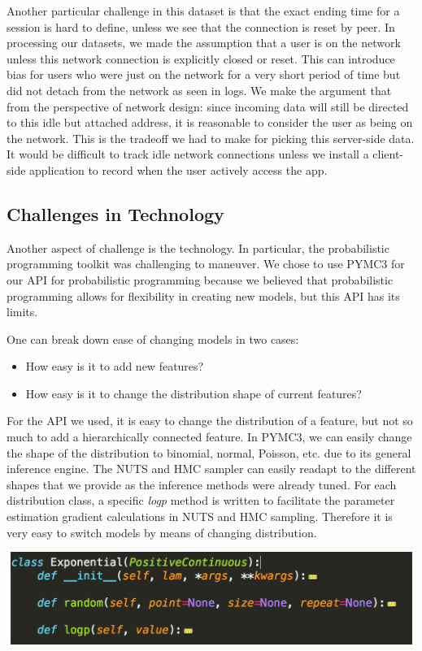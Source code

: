\documentclass[]{article}
\newenvironment{Figure}
  {\par\medskip\noindent\minipage{\linewidth}}
  {\endminipage\par\medskip}
\begin{document}
Another particular challenge in this dataset is that the exact ending time for a session is hard to define, unless we see that the connection is reset by peer. In processing our datasets, we made the assumption that a user is on the network unless this network connection is explicitly closed or reset. This can introduce bias for users who were just on the network for a very short period of time but did not detach from the network as seen in logs. We make the argument that from the perspective of network design: since incoming data will still be directed to this idle but attached address, it is reasonable to consider the user as being on the network. This is the tradeoff we had to make for picking this server-side data. It would be difficult to track idle network connections unless we install a client-side application to record when the user actively access the app.

\subsection{Challenges in Technology}
Another aspect of challenge is the technology. In particular, the probabilistic programming toolkit was challenging to maneuver. We chose to use PYMC3 for our API for probabilistic programming because we believed that probabilistic programming allows for flexibility in creating new models, but this API has its limits. 

One can break down ease of changing models in two cases:

\begin{itemize}
\item
How easy is it to add new features?
\item
How easy is it to change the distribution shape of current features?
\end{itemize}

For the API we used, it is easy to change the distribution of a feature, but not so much to add a hierarchically connected feature. In PYMC3, we can easily change the shape of the distribution to binomial, normal, Poisson, etc. due to its general inference engine. The NUTS and HMC sampler can easily readapt to the different shapes that we provide as the inference methods were already tuned. For each distribution class, a specific \textit{logp} method is written to facilitate the parameter estimation gradient calculations in NUTS and HMC sampling. Therefore it is very easy to switch models by means of changing distribution.

\begin{Figure}
 \centering
 \includegraphics[height = 3cm, width =14cm]{samplePymc.png}
\end{Figure}
\end{document}
